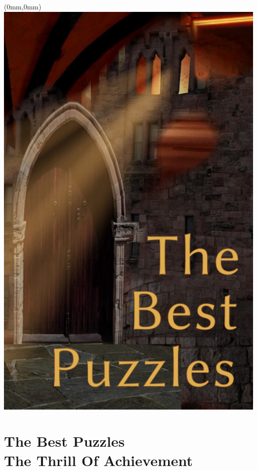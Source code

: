 \documentclass[11.75pt,openany,final]{memoir}
\begin{document}
\chapter*{}
  \begin{textblock*}{70.9mm}(0mm,0mm)
    \includegraphics[width=\paperwidth]{./media/images/puzzle_splash}
  \end{textblock*}
  \chapter{The Best Puzzles\\ \small{The Thrill Of Achievement}}

\end{document}
